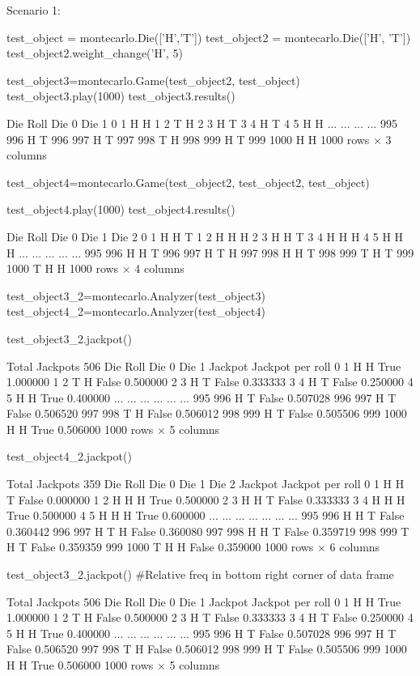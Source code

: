 Scenario 1:

test_object = montecarlo.Die(['H','T'])
test_object2 = montecarlo.Die(['H', 'T'])
test_object2.weight_change('H', 5)

test_object3=montecarlo.Game(test_object2, test_object)
test_object3.play(1000)
test_object3.results()

Die	Roll	Die 0	Die 1
0	1	H	H
1	2	T	H
2	3	H	T
3	4	H	T
4	5	H	H
...	...	...	...
995	996	H	T
996	997	H	T
997	998	T	H
998	999	H	T
999	1000	H	H
1000 rows × 3 columns

test_object4=montecarlo.Game(test_object2, test_object2, test_object)

test_object4.play(1000)
test_object4.results()


Die	Roll	Die 0	Die 1	Die 2
0	1	H	H	T
1	2	H	H	H
2	3	H	H	T
3	4	H	H	H
4	5	H	H	H
...	...	...	...	...
995	996	H	H	T
996	997	H	T	H
997	998	H	H	T
998	999	T	H	T
999	1000	T	H	H
1000 rows × 4 columns

test_object3_2=montecarlo.Analyzer(test_object3)
test_object4_2=montecarlo.Analyzer(test_object4)

test_object3_2.jackpot()

Total Jackpots 506
Die	Roll	Die 0	Die 1	Jackpot	Jackpot per roll
0	1	H	H	True	1.000000
1	2	T	H	False	0.500000
2	3	H	T	False	0.333333
3	4	H	T	False	0.250000
4	5	H	H	True	0.400000
...	...	...	...	...	...
995	996	H	T	False	0.507028
996	997	H	T	False	0.506520
997	998	T	H	False	0.506012
998	999	H	T	False	0.505506
999	1000	H	H	True	0.506000
1000 rows × 5 columns

test_object4_2.jackpot()

Total Jackpots 359
Die	Roll	Die 0	Die 1	Die 2	Jackpot	Jackpot per roll
0	1	H	H	T	False	0.000000
1	2	H	H	H	True	0.500000
2	3	H	H	T	False	0.333333
3	4	H	H	H	True	0.500000
4	5	H	H	H	True	0.600000
...	...	...	...	...	...	...
995	996	H	H	T	False	0.360442
996	997	H	T	H	False	0.360080
997	998	H	H	T	False	0.359719
998	999	T	H	T	False	0.359359
999	1000	T	H	H	False	0.359000
1000 rows × 6 columns

test_object3_2.jackpot()
#Relative freq in bottom right corner of data frame

Total Jackpots 506
Die	Roll	Die 0	Die 1	Jackpot	Jackpot per roll
0	1	H	H	True	1.000000
1	2	T	H	False	0.500000
2	3	H	T	False	0.333333
3	4	H	T	False	0.250000
4	5	H	H	True	0.400000
...	...	...	...	...	...
995	996	H	T	False	0.507028
996	997	H	T	False	0.506520
997	998	T	H	False	0.506012
998	999	H	T	False	0.505506
999	1000	H	H	True	0.506000
1000 rows × 5 columns

